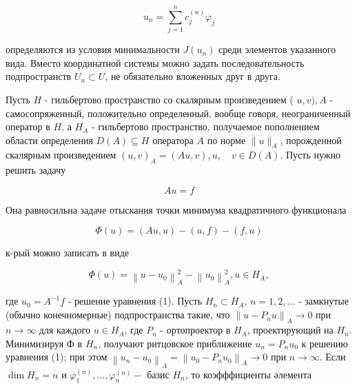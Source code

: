 \documentclass[10pt]{article}
\begin{document}
\[

u_{n}=\sum_{j=1}^{n} c_{j}^{(n)} \varphi_{j}

\]



определяются из условия минимальности $J\left(u_{n}\right)$ среди элементов указанного вида. Вместо координатной системы можно задать последовательность подпространств $U_{n} \subset U$, не обязательно вложенных друг в друга.



Пусть $H$ - гильбертово пространство со скалярным произведением ( $u, v), A$ - самосопряженный, положительно определенный, вообще говоря, неограниченный оператор в $H$, а $H_{A}$ - гильбертово пространство, получаемое пополнением области определения $D(A) \subseteq H$ оператора $A$ по норме $\|u\|_{A}$, порожденной скалярным произведением $(u, v)_{A}=(A u, v), u, \quad v \in D(A)$. Пусть нужно решить задачу



\[

A u=f

\]



Она равносильна задаче отыскания точки минимума квадратичного функционала



\[

\Phi(u)=(A u, u)-(u, f)-(f, u)

\]



к-рый можно записать в виде



\[

\Phi(u)=\left\|u-u_{0}\right\|_{A}^{2}-\left\|u_{0}\right\|_{A}^{2}, u \in H_{A},

\]



где $u_{0}=A^{-1} f$ - решение уравнения (1). Пусть $H_{n} \subset H_{A}$, $n=1,2, \ldots$ - замкнутые (обычно конечномерные) подпространства такие, что $\left\|u-P_{n} u\right\|_{A} \rightarrow 0$ при $n \rightarrow \infty$ для каждого $u \in H_{A}$, где $P_{n}$ - ортопроектор в $H_{A}$, проектирующий на $H_{n}$. Минимизируя Ф в $H_{n}$, получают ритцовское приближение $u_{n}=P_{n} u_{0}$ к решению уравнения (1); при этом $\left\|u_{n}-u_{0}\right\|_{A}=\left\|u_{0}-P_{n} u_{0}\right\|_{A} \rightarrow 0$ при $n \rightarrow \infty$. Если $\operatorname{dim} H_{n}=n$ и $\varphi_{1}^{(n)}, \ldots, \varphi_{n}^{(n)}-$ базис $H_{n}$, то коэфффициенты әлемента
\end{document}
